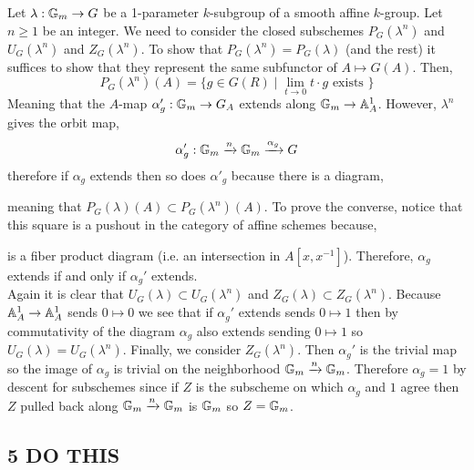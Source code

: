 \documentclass[12pt]{article}
\begin{document}
Let $\lambda : \mathbb{G}_m \to G$ be a 1-parameter $k$-subgroup of a smooth affine $k$-group. Let $n \ge 1$ be an integer. We need to consider the closed subschemes $P_G(\lambda^n)$ and $U_G(\lambda^n)$ and $Z_G(\lambda^n)$. To show that $P_G(\lambda^n) = P_G(\lambda)$ (and the rest) it suffices to show that they represent the same subfunctor of $A \mapsto G(A)$. Then,
\[ P_G(\lambda^n)(A) = \{ g \in G(R) \mid \lim_{t \to 0} t \cdot g \text{ exists } \} \]
Meaning that the $A$-map $\alpha_g' : \mathbb{G}_m \to G_A$ extends along $\mathbb{G}_m \to \mathbb{A}^1_A$. However, $\lambda^n$ gives the orbit map,
\[ \alpha'_g : \mathbb{G}_m \xrightarrow{n} \mathbb{G}_m \xrightarrow{\alpha_g} G \]
therefore if $\alpha_g$ extends then so does $\alpha'_g$ because there is a diagram,
\begin{center}
\end{center}
meaning that $P_G(\lambda)(A) \subset P_G(\lambda^n)(A)$. To prove the converse, notice that this square is a pushout in the category of affine schemes because,
\begin{center}
\end{center}
is a fiber product diagram (i.e. an intersection in $A[x, x^{-1}]$). Therefore, $\alpha_g$ extends if and only if $\alpha_g'$ extends.
\bigskip\\
Again it is clear that $U_G(\lambda) \subset U_G(\lambda^n)$ and $Z_G(\lambda) \subset Z_G(\lambda^n)$. Because $\mathbb{A}^1_A \to \mathbb{A}^1_A$ sends $0 \mapsto 0$ we see that if $\alpha_g'$ extends sends $0 \mapsto 1$ then by commutativity of the diagram $\alpha_g$ also extends sending $0 \mapsto 1$ so $U_G(\lambda) = U_G(\lambda^n)$. Finally, we consider $Z_G(\lambda^n)$. Then $\alpha_g'$ is the trivial map so the image of $\alpha_g$ is trivial on the \etale neighborhood $\mathbb{G}_m \xrightarrow{n} \mathbb{G}_m$. Therefore $\alpha_g = 1$ by \etale descent for subschemes since if $Z$ is the subscheme on which $\alpha_g$ and $1$ agree then $Z$ pulled back along $\mathbb{G}_m \xrightarrow{n} \mathbb{G}_m$ is $\mathbb{G}_m$ so $Z = \mathbb{G}_m$.

\subsection{5 DO THIS}
\end{document}
